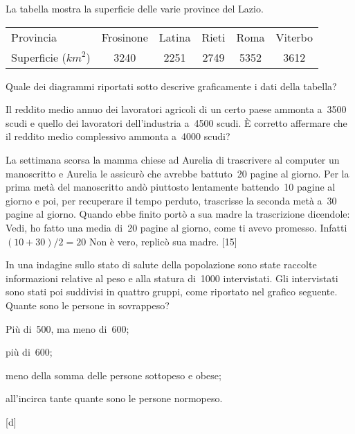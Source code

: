 \begin{esercizio}
\label{ese:A.59}
La tabella mostra la superficie delle varie province del Lazio.
\begin{center}
 \begin{tabular}{l*{5}{c}}
 \toprule
 Provincia & Frosinone & Latina & Rieti & Roma & Viterbo\\
 Superficie ($\unit{km}^2$) & 3240& 2251& 2749& 5352& 3612\\
 \bottomrule
 \end{tabular}
\end{center}
Quale dei diagrammi riportati sotto descrive graficamente i dati della 
tabella?
\begin{center}
 
\end{center}

\end{esercizio}

\begin{esercizio}
\label{ese:A.48}
Il reddito medio annuo dei lavoratori agricoli di un certo paese ammonta 
a~3500 scudi e quello dei lavoratori dell'industria
a~4500 scudi. È corretto affermare che il reddito medio complessivo ammonta 
a~4000 scudi?
\end{esercizio}

\begin{esercizio}
\label{ese:A.49}
La settimana scorsa la mamma chiese ad Aurelia di trascrivere al computer 
un manoscritto e Aurelia le assicurò che avrebbe
battuto~20 pagine al giorno. Per la prima metà del manoscritto andò 
piuttosto lentamente battendo~10 pagine al giorno e poi,
per recuperare il tempo perduto, trascrisse la seconda metà a~30 pagine al 
giorno.
Quando ebbe finito portò a sua madre la trascrizione dicendole: Vedi, ho 
fatto una media di~20 pagine al giorno,
come ti avevo promesso. Infatti~$(10+30)/2=20$ Non è vero, replicò sua 
madre.
\hfill [15]
\end{esercizio}

\begin{multicols}{2}
\begin{esercizio}
\label{ese:A.50}
In una indagine sullo stato di salute della popolazione sono state raccolte 
informazioni relative al peso e
alla statura di~1000 intervistati. Gli intervistati sono stati poi 
suddivisi in quattro gruppi,
come riportato nel grafico seguente. Quante sono le persone in sovrappeso?

\begin{enumeratea}
 \item Più di~500, ma meno di~600;
 \item più di~600;
 \item meno della somma delle persone sottopeso e obese;
 \item all'incirca tante quante sono le persone normopeso.
\end{enumeratea}
\begin{center}
 
\end{center}
\hfill [d]
\end{esercizio}
\end{multicols}

